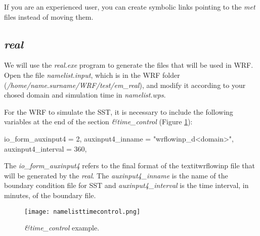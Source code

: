 \begin{tcolorbox}[enhanced,
    grow to left by=0cm,%
    grow to right by=0cm,%
    enlarge top by=0cm,%
    enlarge bottom by=0cm,%
    tcbox raise base,
    boxrule=1.0pt,
    left=18mm,
    colframe=green!50!black,coltext=green!25!black,colback=green!10!white,
    overlay={\begin{tcbclipinterior}\fill[green!75!blue!50!white] (frame.south west)
      rectangle node[text=white,font=\sffamily\bfseries\footnotesize,rotate=0] {NOTE} ([xshift=18mm]frame.north west);\end{tcbclipinterior}}]
If you are an experienced user, you can create symbolic links pointing to the \textit{met} files instead of moving them.
  \end{tcolorbox}
  \bigskip

\subsection{\textit{real}}\label{realsecao}
\bigskip

\noindent We will use the \textit{real.exe} program to generate the files that will be used in WRF. Open the file \textit{namelist.input}, 
which is in the WRF folder (\textit{/home/name.surname/WRF/test/em\_real}), and modify it according to your chosed domain and simulation time in 
\textit{namelist.wps}.
\bigskip

\noindent For the WRF to simulate the SST, it is necessary to include the following variables at the end of the section 
\textit{\&time\_control} (Figure \textcolor{bleu_cite}{\ref{timecontrolnamelist}}):
\bigskip

\begin{bashcode}
io_form_auxinput4  = 2,
auxinput4_inname   = "wrflowinp_d<domain>",
auxinput4_interval = 360,
\end{bashcode}
\bigskip

\noindent The \textit{io\_form\_auxinput4} refers to the final format of the textit{wrflowinp} file that will be generated by 
the \textit{real}. The \textit{auxinput4\_inname} is the name of the boundary condition file for SST and \textit{auxinput4\_interval} 
is the time interval, in minutes, of the boundary file.
\bigskip

\begin{figure}[H]
    \centering
    \texttt{[image: namelisttimecontrol.png]}
    \caption{\textit{\&time\_control} example.}
    \label{timecontrolnamelist}
\end{figure}
\bigskip

